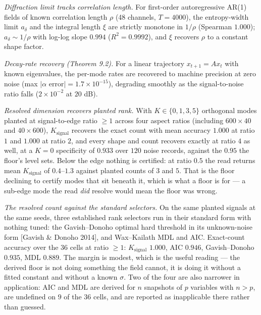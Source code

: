 \documentclass[10pt,letterpaper,twocolumn]{article}
\begin{document}
\emph{Diffraction limit tracks correlation length.} For first-order autoregressive AR(1) fields of known correlation length \(\rho\) (48 channels, \(T=4000\)), the entropy-width limit \(a_\delta\) and the integral length \(\xi\) are strictly monotone in \(1/\rho\) (Spearman \(1.000\)); \(a_\delta\sim 1/\rho\) with log-log slope \(0.994\) (\(R^2=0.9992\)), and \(\xi\) recovers \(\rho\) to a constant shape factor.

\emph{Decay-rate recovery (Theorem 9.2).} For a linear trajectory \(x_{t+1}=Ax_t\) with known eigenvalues, the per-mode rates are recovered to machine precision at zero noise (max \(|\alpha\text{ error}|=1.7\times10^{-15}\)), degrading smoothly as the signal-to-noise ratio falls (\(2\times10^{-2}\) at \(20\) dB).

\emph{Resolved dimension recovers planted rank.} With \(K\in\{0,1,3,5\}\) orthogonal modes planted at signal-to-edge ratio \(\ge 1\) across four aspect ratios (including \(600\times40\) and \(40\times600\)), \(K_{\mathrm{signal}}\) recovers the exact count with mean accuracy \(1.000\) at ratio \(1\) and \(1.000\) at ratio \(2\), and every shape and count recovers exactly at ratio \(4\) as well, at a \(K=0\) specificity of \(0.933\) over \(120\) noise records, against the \(0.95\) the floor's level sets. Below the edge nothing is certified: at ratio \(0.5\) the read returns mean \(K_{\mathrm{signal}}\) of \(0.4\)--\(1.3\) against planted counts of \(3\) and \(5\). That is the floor declining to certify modes that sit beneath it, which is what a floor is for --- a sub-edge mode the read \emph{did} resolve would mean the floor was wrong.

\emph{The resolved count against the standard selectors.} On the same planted signals at the same seeds, three established rank selectors run in their standard form with nothing tuned: the Gavish--Donoho optimal hard threshold in its unknown-noise form {[}Gavish \& Donoho 2014{]}, and Wax--Kailath MDL and AIC. Exact-count accuracy over the 36 cells at ratio \(\ge1\): \(K_{\mathrm{signal}}\) \(1.000\), AIC \(0.946\), Gavish--Donoho \(0.935\), MDL \(0.889\). The margin is modest, which is the useful reading --- the derived floor is not doing something the field cannot, it is doing it without a fitted constant and without a known \(\sigma\). Two of the four are also narrower in application: AIC and MDL are derived for \(n\) snapshots of \(p\) variables with \(n>p\), are undefined on \(9\) of the \(36\) cells, and are reported as inapplicable there rather than guessed.
\end{document}
